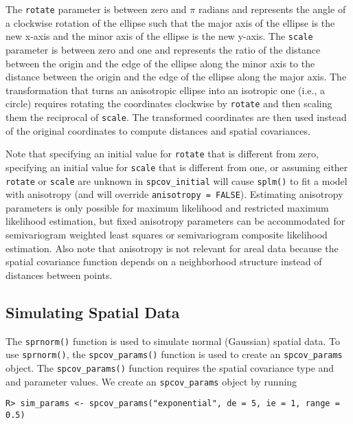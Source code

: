 \documentclass[10pt,letterpaper]{article}
\begin{document}
The \texttt{rotate} parameter is between zero and \(\pi\) radians and
represents the angle of a clockwise rotation of the ellipse such that
the major axis of the ellipse is the new x-axis and the minor axis of
the ellipse is the new y-axis. The \texttt{scale} parameter is between
zero and one and represents the ratio of the distance between the origin
and the edge of the ellipse along the minor axis to the distance between
the origin and the edge of the ellipse along the major axis. The
transformation that turns an anisotropic ellipse into an isotropic one
(i.e., a circle) requires rotating the coordinates clockwise by
\texttt{rotate} and then scaling them the reciprocal of \texttt{scale}.
The transformed coordinates are then used instead of the original
coordinates to compute distances and spatial covariances.

Note that specifying an initial value for \texttt{rotate} that is
different from zero, specifying an initial value for \texttt{scale} that
is different from one, or assuming either \texttt{rotate} or
\texttt{scale} are unknown in \texttt{spcov\_initial} will cause
\texttt{splm()} to fit a model with anisotropy (and will override
\texttt{anisotropy\ =\ FALSE}). Estimating anisotropy parameters is only
possible for maximum likelihood and restricted maximum likelihood
estimation, but fixed anisotropy parameters can be accommodated for
semivariogram weighted least squares or semivariogram composite
likelihood estimation. Also note that anisotropy is not relevant for
areal data because the spatial covariance function depends on a
neighborhood structure instead of distances between points.

\hypertarget{sec:sim_data}{%
\subsection{Simulating Spatial Data}\label{sec:sim_data}}

The \texttt{sprnorm()} function is used to simulate normal (Gaussian)
spatial data. To use \texttt{sprnorm()}, the \texttt{spcov\_params()}
function is used to create an \texttt{spcov\_params} object. The
\texttt{spcov\_params()} function requires the spatial covariance type
and and parameter values. We create an \texttt{spcov\_params} object by
running

\begin{verbatim}
R> sim_params <- spcov_params("exponential", de = 5, ie = 1, range = 0.5)
\end{verbatim}
\end{document}
